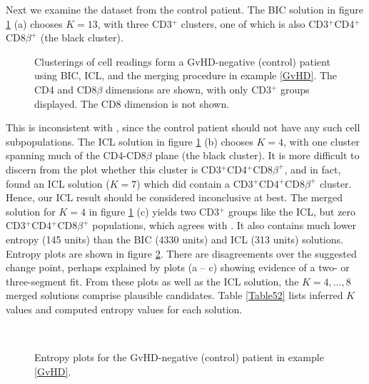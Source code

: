 \documentclass{uwstat572}
\renewcommand\;{\,}
\begin{document}
Next we examine the dataset from the control patient.
The BIC solution in figure \ref{control} (a) chooses $K = 13$, with three CD3$^+$ clusters, one of which is also CD3$^+$CD4$^+$CD8$\beta^+$ (the black cluster).
\begin{figure}
\begin{center}
\end{center}
\caption{Clusterings of cell readings form a GvHD-negative (control) patient using BIC, ICL, and the merging procedure in example \ref{GvHD}. The CD4 and CD8$\beta$ dimensions are shown, with only CD3$^+$ groups displayed. The CD8 dimension is not shown.}
\label{control}
\end{figure}
This is inconsistent with \cite{Brinkman07}, since the control patient should not have any such cell subpopulations.
The ICL solution in figure \ref{control} (b) chooses $K = 4$, with one cluster spanning much of the CD4-CD8$\beta$ plane (the black cluster).
It is more difficult to discern from the plot whether this cluster is CD3$^+$CD4$^+$CD8$\beta^+$, and in fact, \cite{Baudry10} found an ICL solution ($K = 7$) which did contain a CD3$^+$CD4$^+$CD8$\beta^+$ cluster.
Hence, our ICL result should be considered inconclusive at best.
The merged solution for $K = 4$ in figure \ref{control} (c) yields two CD3$^+$ groups like the ICL, but zero CD3$^+$CD4$^+$CD8$\beta^+$ populations, which agrees with \cite{Brinkman07}.
It also contains much lower entropy (145 units) than the BIC (4330 units) and ICL (313 units) solutions.
Entropy plots are shown in figure \ref{Entropy5_2}.
There are disagreements over the suggested change point, perhaps explained by plots (a -- c) showing evidence of a two- or three-segment fit.
From these plots as well as the ICL solution, the $K = 4, \dotsc, 8$ merged solutions comprise plausible candidates.
Table \ref{Table52} lists inferred $K$ values and computed entropy values for each solution.

\begin{figure}
\begin{center}
\\ \vspace{-1em}
\end{center}
\caption{Entropy plots for the GvHD-negative (control) patient in example \ref{GvHD}.}
\label{Entropy5_2}
\end{figure}
\end{document}
